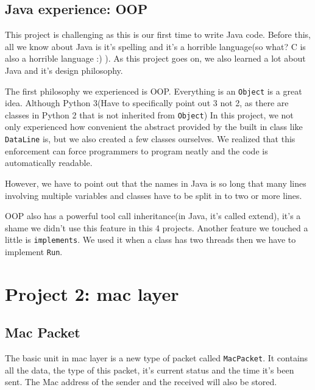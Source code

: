 \documentclass[conference,compsoc]{IEEEtran}
\begin{document}
	\subsection{Java experience: OOP}
		This project is challenging as this is our first time to write Java code.
		Before this, all we know about Java is it's spelling and it's a horrible language(so what? C is also a horrible language :) ).
		As this project goes on, we also learned a lot about Java and it's design philosophy.
		\par
		The first philosophy we experienced is OOP. 
		Everything is an \lstinline{Object} is a great idea.
		Although Python 3(Have to specifically point out 3 not 2, as there are classes in Python 2 that is not inherited from \lstinline{Object})
		In this project, we not only experienced how convenient the abstract provided by the built in class like \lstinline{DataLine} is, but we also created a few classes ourselves.
		We realized that this enforcement can force programmers to program neatly and the code is automatically readable.
		\par
		However, we have to point out that the names in Java is so long that many lines involving multiple variables and classes have to be split in to two or more lines.
		\par
		OOP also has a powerful tool call inheritance(in Java, it's called extend), it's a shame we didn't use this feature in this 4 projects. 
		Another feature we touched a little is \lstinline{implements}.
		We used it when a class has two threads then we have to implement \lstinline{Run}.

\section{Project 2: mac layer}
	
	\subsection{Mac Packet}
		The basic unit in mac layer is a new type of packet called \lstinline{MacPacket}. 
		It contains all the data, the type of this packet, it's current status and the time it's been sent. 
		The Mac address of the sender and the received will also be stored.
\end{document}
